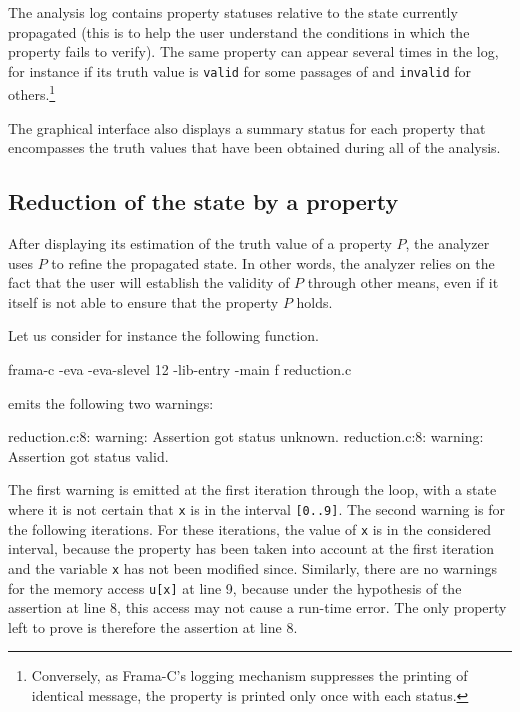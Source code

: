 \documentclass{frama-c-book}
\begin{document}
The analysis log contains property statuses relative to the state
currently propagated (this is to help the user understand the
conditions in which the property fails to verify). The same property
can appear several times in the log, for instance if its truth value is
\lstinline|valid| for some passages of \Eva{} and
\lstinline|invalid| for others.\footnote{Conversely, as Frama-C's
logging mechanism suppresses the printing of identical message,
the property is printed only once with each status.}


The graphical interface also displays a summary status for each
property that encompasses the truth values that have been obtained
during all of the analysis.



\subsection{Reduction of the state by a property}
\label{reduction_proprietes}

After displaying its estimation of the truth value of a property $P$,
the analyzer uses $P$ to refine the propagated state.
In other words, the analyzer relies on the fact that the user will establish
the validity of $P$ through other means, even if it itself is not able to
ensure that the property $P$ holds.

Let us consider for instance the following function.


\begin{frama-c-commands}
frama-c -eva -eva-slevel 12 -lib-entry -main f reduction.c
\end{frama-c-commands}

\Eva{} emits the following two warnings:
\begin{logs}
reduction.c:8: warning: Assertion got status unknown.
reduction.c:8: warning: Assertion got status valid.
\end{logs}
The first warning is emitted at the first iteration through the loop,
with a state where it is not certain that \lstinline|x| is in the interval
\lstinline|[0..9]|. The second warning is for the following iterations.
For these iterations, the value of \lstinline|x|
is in the considered interval, because the property has been taken into account
at the first iteration and the variable \lstinline|x| has not been modified since.
Similarly, there are no warnings for the memory access \lstinline|u[x]| at
line 9, because under the hypothesis of the assertion at line 8,
this access may not cause a run-time error. The only property left
to prove is therefore the assertion at line 8.
\end{document}
